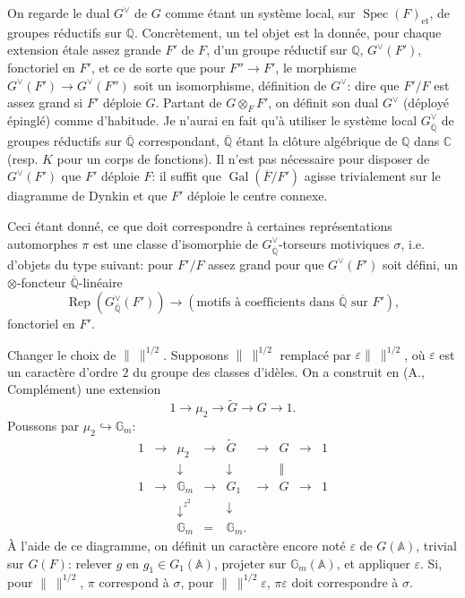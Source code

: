 \documentclass[11pt]{article}
\newcommand{\Gal}{\operatorname{Gal}}
\newcommand{\Spec}{\operatorname{Spec}}
\newcommand{\Rep}{\operatorname{Rep}}
\newcommand{\Fbar}{\overline F}
\newcommand{\normchar}{\|\ \|}
\begin{document}
On regarde le dual \(G^\vee\) de \(G\) comme étant un système local, sur \(\Spec(F)_{\mathrm{et}}\), de groupes réductifs sur \(\mathbb Q\). Concrètement, un tel objet est la donnée, pour chaque extension étale assez grande \(F'\) de \(F\), d'un groupe réductif sur \(\mathbb Q\), \(G^\vee(F')\), fonctoriel en \(F'\), et ce de sorte que pour \(F''\to F'\), le morphisme \(G^\vee(F')\to G^\vee(F'')\) soit un isomorphisme, définition de \(G^\vee\): dire que \(F'/F\) est assez grand si \(F'\) déploie \(G\). Partant de \(G\otimes_F F'\), on définit son dual \(G^\vee\) (déployé épinglé) comme d'habitude. Je n'aurai en fait qu'à utiliser le système local \(G^\vee_{\overline{\mathbb Q}}\) de groupes réductifs sur \(\overline{\mathbb Q}\) correspondant, \(\overline{\mathbb Q}\) étant la clôture algébrique de \(\mathbb Q\) dans \(\mathbb C\) (resp. \(K\) pour un corps de fonctions). Il n'est pas nécessaire pour disposer de \(G^\vee(F')\) que \(F'\) déploie \(F\): il suffit que \(\Gal(\Fbar/F')\) agisse trivialement sur le diagramme de Dynkin et que \(F'\) déploie le centre connexe.

Ceci étant donné, ce que doit correspondre à certaines représentations automorphes \(\pi\) est une classe d'isomorphie de \(G^\vee_{\overline{\mathbb Q}}\)-torseurs motiviques \(\sigma\), i.e. d'objets du type suivant: pour \(F'/F\) assez grand pour que \(G^\vee(F')\) soit défini, un \(\otimes\)-foncteur \(\overline{\mathbb Q}\)-linéaire
\[
\Rep(G^\vee_{\overline{\mathbb Q}}(F'))\longrightarrow
(\text{motifs à coefficients dans }\overline{\mathbb Q}\text{ sur }F'),
\]
fonctoriel en \(F'\).

Changer le choix de \(\normchar^{1/2}\). Supposons \(\normchar^{1/2}\) remplacé par \(\varepsilon\normchar^{1/2}\), où \(\varepsilon\) est un caractère d'ordre \(2\) du groupe des classes d'idèles. On a construit en (A., Complément) une extension
\[
1\longrightarrow\mu_2\longrightarrow\widetilde G\longrightarrow G\longrightarrow1.
\]
Poussons par \(\mu_2\hookrightarrow\mathbb G_m\):
\[
\begin{array}{ccccccccc}
1&\longrightarrow&\mu_2&\longrightarrow&\widetilde G&\longrightarrow&G&\longrightarrow&1\\
&&\downarrow&&\downarrow&&\Vert\\
1&\longrightarrow&\mathbb G_m&\longrightarrow&G_1&\longrightarrow&G&\longrightarrow&1\\
&&\downarrow^{z^2}&&\downarrow\\
&&\mathbb G_m&=&\mathbb G_m.
\end{array}
\]
À l'aide de ce diagramme, on définit un caractère encore noté \(\varepsilon\) de \(G(\mathbb A)\), trivial sur \(G(F)\): relever \(g\) en \(g_1\in G_1(\mathbb A)\), projeter sur \(\mathbb G_m(\mathbb A)\), et appliquer \(\varepsilon\). Si, pour \(\normchar^{1/2}\), \(\pi\) correspond à \(\sigma\), pour \(\normchar^{1/2}\varepsilon\), \(\pi\varepsilon\) doit correspondre à \(\sigma\).
\end{document}
